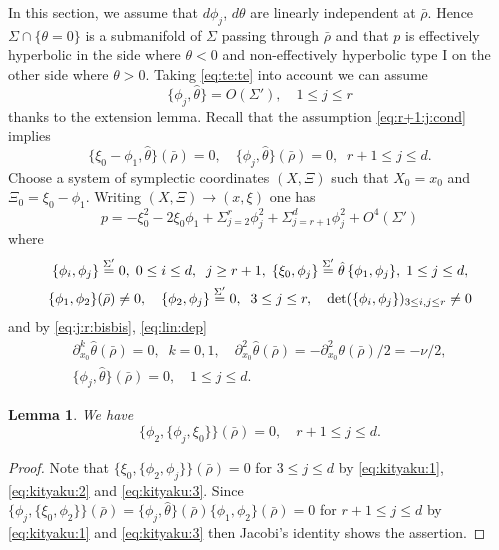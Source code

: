 \documentclass[12pt,leqno]{article} %
\def\dif{\partial}
\def\sieq{\overset{\Sigma'}{=}}
\def\bro{\bar\rho}
\def\bro{\bar\rho}
\numberwithin{equation}{section}
\newtheorem{lem}{Lemma}[section]
\begin{document}
In this section, we assume that $d\phi_j$, $d\theta$ are linearly independent at $\bro$. Hence $\Sigma\cap\{\theta=0\}$ is a submanifold of $\Sigma$ passing through $\bro$ and that $p$ is effectively hyperbolic in the side where $\theta<0$  and non-effectively hyperbolic type I on the other side where $\theta>0$. 
Taking \eqref{eq:te:te} into account we can assume
%
%
\begin{equation}
\label{eq:j:r:bisbis}
\{\phi_j, \hat\theta\}=O(\Sigma'),\quad 1\leq j\leq r
\end{equation}
%
thanks to the extension lemma. Recall that the assumption \eqref{eq:r+1:j:cond} implies
%
\begin{equation}
\label{eq:lin:dep}
\{\xi_0-\phi_1,\hat\theta\}(\bro)=0,\quad \{\phi_j,\hat\theta\}(\bro)=0,\;\; r+1\leq j\leq d.
\end{equation}
%
Choose a system of symplectic coordinates $(X,\Xi)$ such that $X_0=x_0$ and $\Xi_0=\xi_0-\phi_1$. Writing $(X,\Xi)\to (x,\xi)$ one has 
%
\[
p=-\xi_0^2-2\xi_0\phi_1+\Sigma_{j=2}^r\phi_j^2+\Sigma_{j=r+1}^d\phi_j^2+O^4(\Sigma')
\]
%
where
%
\begin{gather}
\label{eq:kityaku:1}
\{\phi_i,\phi_j\}\sieq 0,\; 0\leq i\leq d,\;\;j\geq r+1,\; \{\xi_0,\phi_j\}\sieq \hat\theta\,\{\phi_1,\phi_j\},\; 1\leq j\leq d,\\
\label{eq:kityaku:2}
\{\phi_1,\phi_2\}(\bro)\neq 0,\quad \{\phi_2,\phi_j\}\sieq 0, \;\; 3\leq j\leq r,\quad {\rm det}(\{\phi_i,\phi_j\})_{3\leq i,j\leq r}\neq 0
\end{gather}
%
and by \eqref{eq:j:r:bisbis}, \eqref{eq:lin:dep}
%
\begin{equation}
\label{eq:kityaku:3}
\begin{split}
 \dif_{x_0}^k\hat\theta(\bro)=0,\;\; k=0,1,\quad  \dif_{x_0}^2\hat\theta(\bro)=-\dif_{x_0}^2\theta(\bro)/2=-\nu/2,\\
  \{\phi_j,\hat\theta\}(\bro)=0,\quad 1\leq j\leq d.
  \end{split}
\end{equation}
%
%
%
%
\begin{lem}
\label{lem:te:r+1:a}We have
%
\[
\{\phi_2,\{\phi_j,\xi_0\}\}(\bro)=0,\quad r+1\leq j\leq  d.
\]
%
\end{lem}
%
\begin{proof}Note that $\{\xi_0,\{\phi_2,\phi_j\}\}(\bro)=0$ for $3\leq j\leq d$ by \eqref{eq:kityaku:1},   \eqref{eq:kityaku:2} and \eqref{eq:kityaku:3}. Since $
\{\phi_j, \{\xi_0,\phi_2\}\}(\bro)=\{\phi_j,\hat\theta\}(\bro)\{\phi_1,\phi_2\}(\bro)=0$ 
for $r+1\leq j\leq d$ by \eqref{eq:kityaku:1} and \eqref{eq:kityaku:3} then Jacobi's identity shows the assertion.
\end{proof}
\end{document}
